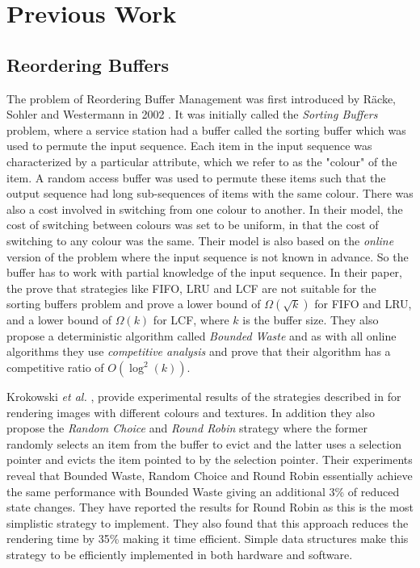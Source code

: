 \chapter{Previous Work} \label{previouswork}

\section{Reordering Buffers} \label{section2} 
The problem of Reordering Buffer Management was first introduced by R\"acke, Sohler and Westermann in 2002 \cite{racke2002online}. It was initially called the \textit{Sorting Buffers} problem, where a service station had a buffer called the sorting buffer which was used to permute the input sequence. Each item in the input sequence was characterized by a particular attribute, which we refer to as the "colour" of the item. A random access buffer was used to permute these items such that the output sequence had long sub-sequences of items with the same colour. There was also a cost involved in switching from one colour to another. In their model, the cost of switching between colours was set to be uniform, in that the cost of switching to any colour was the same. Their model is also based on the \textit{online} version of the problem where the input sequence is not known in advance. So the buffer has to work with partial knowledge of the input sequence. In their paper, the prove that strategies like FIFO, LRU and LCF are not suitable for the sorting buffers problem and prove a lower bound of $\Omega(\sqrt{k})$ for FIFO  and LRU, and a lower bound of $\Omega(k)$ for LCF, where $k$ is the buffer size. They also propose a deterministic algorithm called \textit{Bounded Waste} and as with all online algorithms they use \textit{competitive analysis} and prove that their algorithm has a competitive ratio of $O(\log^2(k))$. 

Krokowski \textit{et al.} \cite{krokowski2004reducing}, provide experimental results of the strategies described in \cite{racke2002online} for rendering images with different colours and textures. In addition they also propose the \textit{Random Choice} and \textit{Round Robin} strategy where the former randomly selects an item from the buffer to evict and the latter uses a selection pointer and evicts the item pointed to by the selection pointer. Their experiments reveal that Bounded Waste, Random Choice and Round Robin essentially achieve the same performance with Bounded Waste giving an additional 3\% of reduced state changes. They have reported the results for Round Robin as this is the most simplistic strategy to implement. They also found that this approach reduces the rendering time by 35\% making it time efficient. Simple data structures make this strategy to be efficiently implemented in both hardware and software. 

